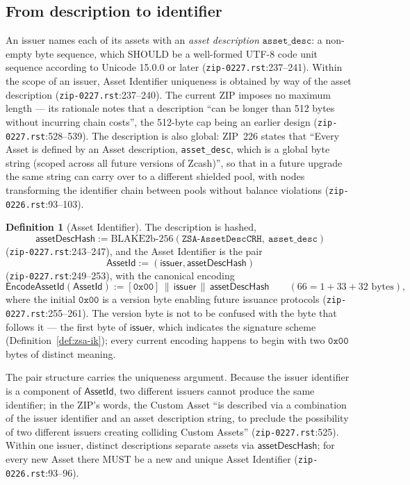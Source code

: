 \documentclass[11pt,a4paper]{article}
\theoremstyle{definition}
\newtheorem{definition}[theorem]{Definition}
\begin{document}
\subsection{From description to identifier}\label{sec:zsa-asset-id}

An issuer names each of its assets with an \emph{asset description}
$\texttt{asset\_desc}$: a non-empty byte sequence, which SHOULD be a
well-formed UTF-8 code unit sequence according to Unicode 15.0.0 or later
(\texttt{zip-0227.rst}:237--241). Within the scope of an issuer, Asset
Identifier uniqueness is obtained by way of the asset description
(\texttt{zip-0227.rst}:237--240). The current ZIP imposes no maximum
length --- its rationale notes that a description ``can be longer than 512
bytes without incurring chain costs'', the 512-byte cap being an earlier
design (\texttt{zip-0227.rst}:528--539). The description is also global:
ZIP~226 states that ``Every Asset is defined by an Asset description,
\texttt{asset\_desc}, which is a global byte string (scoped across all
future versions of Zcash)'', so that in a future upgrade the same string
can carry over to a different shielded pool, with nodes transforming the
identifier chain between pools without balance violations
(\texttt{zip-0226.rst}:93--103).

\begin{definition}[Asset Identifier]\label{def:zsa-asset-id}
The description is hashed,
\[
\mathsf{assetDescHash} :=
\mathrm{BLAKE2b\text{-}256}(\texttt{ZSA-AssetDescCRH},\
\texttt{asset\_desc})
\]
(\texttt{zip-0227.rst}:243--247), and the Asset Identifier is the pair
\[
\mathsf{AssetId} := (\mathsf{issuer}, \mathsf{assetDescHash})
\]
(\texttt{zip-0227.rst}:249--253), with the canonical encoding
\[
\mathsf{EncodeAssetId}(\mathsf{AssetId}) :=
[\mathtt{0x00}] \,\|\, \mathsf{issuer} \,\|\, \mathsf{assetDescHash}
\qquad (66 = 1 + 33 + 32 \text{ bytes}),
\]
where the initial $\mathtt{0x00}$ is a version byte enabling future
issuance protocols (\texttt{zip-0227.rst}:255--261). The version byte is
not to be confused with the byte that follows it --- the first byte of
$\mathsf{issuer}$, which indicates the signature scheme
(Definition~\ref{def:zsa-ik}); every current encoding happens to begin
with two $\mathtt{0x00}$ bytes of distinct meaning.
\end{definition}

The pair structure carries the uniqueness argument. Because the issuer
identifier is a component of $\mathsf{AssetId}$, two different issuers
cannot produce the same identifier; in the ZIP's words, the Custom Asset
``is described via a combination of the issuer identifier and an asset
description string, to preclude the possibility of two different issuers
creating colliding Custom Assets'' (\texttt{zip-0227.rst}:525). Within one
issuer, distinct descriptions separate assets via
$\mathsf{assetDescHash}$; for every new Asset there MUST be a new and
unique Asset Identifier (\texttt{zip-0226.rst}:93--96).
\end{document}
